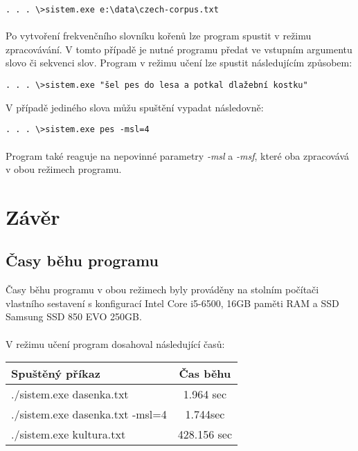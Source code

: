 ﻿\documentclass[12pt, a4paper]{article}
\begin{document}
\begin{verbatim}
. . . \>sistem.exe e:\data\czech-corpus.txt
\end{verbatim}

\paragraph{}
Po vytvoření frekvenčního slovníku kořenů lze program spustit v režimu zpracovávání. V tomto případě je nutné programu předat ve vstupním argumentu slovo či sekvenci slov. Program v režimu učení lze spustit následujícím způsobem:

\begin{verbatim}
. . . \>sistem.exe "šel pes do lesa a potkal dlažební kostku"
\end{verbatim} 

V případě jediného slova můžu spuštění vypadat následovně:

\begin{verbatim}
. . . \>sistem.exe pes -msl=4
\end{verbatim}

\paragraph{}
Program také reaguje na nepovinné parametry \textit{-msl} a \textit{-msf}, které oba zpracovává v obou režimech programu.  

\newpage
\section{Závěr}
\subsection{Časy běhu programu}
Časy běhu programu v obou režimech byly prováděny na stolním počítači vlastního sestavení s konfigurací Intel Core i5-6500, 16GB paměti RAM a SSD Samsung SSD 850 EVO 250GB.

\paragraph{}
V režimu učení program dosahoval následující časů:
\begin{center}
 \begin{tabular}{||l  |  c  ||}  
 \hline
 Spuštěný příkaz & Čas běhu  \\ [0.5ex] 
 \hline\hline
 ./sistem.exe dasenka.txt & 1.964 sec \\ 
 \hline
 ./sistem.exe dasenka.txt -msl=4 & 1.744sec \\ 
 \hline
 ./sistem.exe kultura.txt & 428.156 sec \\ [1ex] 
 \hline
\end{tabular}
\end{center}
\end{document}
